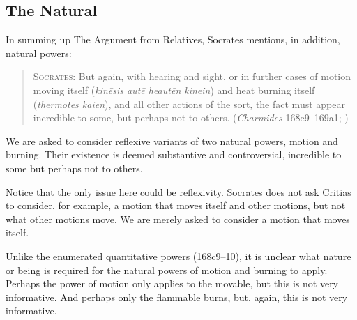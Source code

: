 %


\subsection{The Natural} %
\label{sub:the_natural}

In summing up The Argument from Relatives, Socrates mentions, in addition, natural powers:
\begin{quote}
	\textsc{Socrates}: But again, with hearing and sight, or in further cases of motion moving itself (\emph{kinēsis autē heautēn kinein}) and heat burning itself (\emph{thermotēs kaien}), and all other actions of the sort, the fact must appear incredible to some, but perhaps not to others. (\emph{Charmides} 168e9–169a1; \citealt[68]{Lamb:1927qw})
\end{quote}
We are asked to consider reflexive variants of two natural powers, motion and burning. Their existence is deemed substantive and controversial, incredible to some but perhaps not to others.

Notice that the only issue here could be reflexivity. Socrates does not ask Critias to consider, for example, a motion that moves itself and other motions, but not what other motions move. We are merely asked to consider a motion that moves itself.

Unlike the enumerated quantitative powers (168c9–10), it is unclear what nature or being is required for the natural powers of motion and burning to apply. Perhaps the power of motion only applies to the movable, but this is not very informative. And perhaps only the flammable burns, but, again, this is not very informative. 

